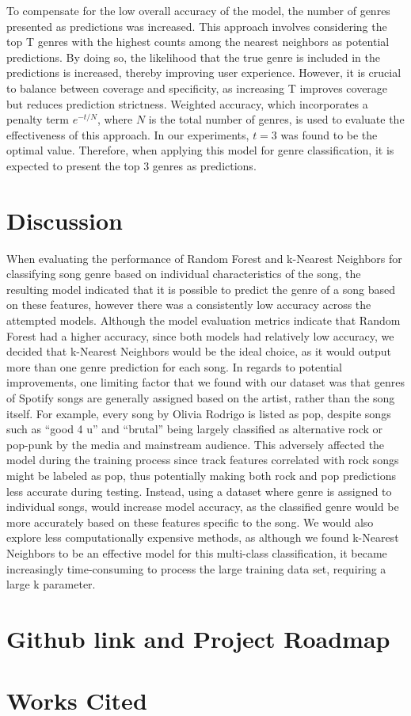 \documentclass[times, twocolumn]{article}
\begin{document}
To compensate for the low overall accuracy of the model, the number of genres presented as predictions was increased. This approach involves considering the top T genres with the highest counts among the nearest neighbors as potential predictions. By doing so, the likelihood that the true genre is included in the predictions is increased, thereby improving user experience. However, it is crucial to balance between coverage and specificity, as increasing T improves coverage but reduces prediction strictness. Weighted accuracy, which incorporates a penalty term $e^{-t/N}$, where $N$ is the total number of genres, is used to evaluate the effectiveness of this approach. In our experiments, $t=3$ was found to be the optimal value. Therefore, when applying this model for genre classification, it is expected to present the top 3 genres as predictions.

\section{Discussion}
When evaluating the performance of Random Forest and k-Nearest Neighbors for classifying song genre based on individual characteristics of the song, the resulting model indicated that it is possible to predict the genre of a song based on these features, however there was a consistently low accuracy across the attempted models. Although the model evaluation metrics indicate that Random Forest had a higher accuracy, since both models had relatively low accuracy, we decided that k-Nearest Neighbors would be the ideal choice, as it would output more than one genre prediction for each song. In regards to potential improvements, one limiting factor that we found with our dataset was that genres of Spotify songs are generally assigned based on the artist, rather than the song itself. For example, every song by Olivia Rodrigo is listed as pop, despite songs such as “good 4 u” and “brutal” being largely classified as alternative rock or pop-punk by the media and mainstream audience. This adversely affected the model during the training process since track features correlated with rock songs might be labeled as pop, thus potentially making both rock and pop predictions less accurate during testing. Instead, using a dataset where genre is assigned to individual songs, would increase model accuracy, as the classified genre would be more accurately based on these features specific to the song. We would also explore less computationally expensive methods, as although we found k-Nearest Neighbors to be an effective model for this multi-class classification, it became increasingly time-consuming to process the large training data set, requiring a large k parameter. 

\section{Github link and Project Roadmap}

\section{Works Cited}
\printbibliography
\end{document}
